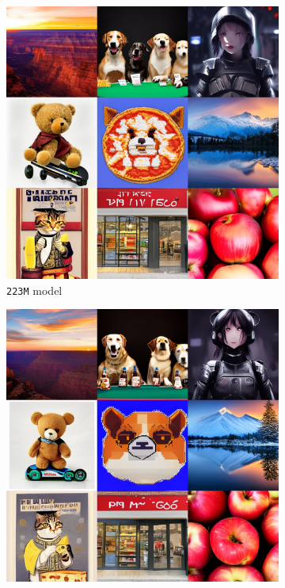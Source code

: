 \begin{figure}[!t]
    \begin{subfigure}[b]{0.32\textwidth}
    \centering
    \includegraphics[width=\textwidth]{cp2/figures/t2i/c160.jpg}
    \caption{\texttt{223M} model}
    \end{subfigure}
    \begin{subfigure}[b]{0.32\textwidth}
    \centering
    \includegraphics[width=\textwidth]{cp2/figures/t2i/c192.jpg}

\end{subfigure}
\end{figure}
